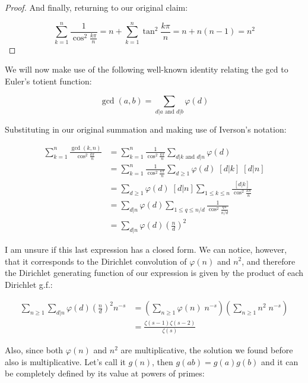 \documentclass{letter}
\begin{document}
\begin{letter}{}
\begin{proof}
  And finally, returning to our original claim:

  $$\sum_{k=1}^{n}\frac{1}{\cos^2\frac{k \pi}{n}}
    = n + \sum_{k=1}^{n}\tan^2\frac{k\pi}{n} = n + n(n-1) = n^2$$
  \end{proof}

 We will now make use of the following well-known identity relating the gcd to Euler's totient function:

 $$\gcd(a, b)=\sum_{d|a \text{ and } d|b}\varphi(d)$$

 Substituting in our original summation and making use of Iverson's notation:

 \begin{align*}
   \sum_{k=1}^{n}\frac{\gcd(k, n)}{\cos^2\frac{k \pi}{n}}
     &= 
       \sum_{k=1}^{n}\frac{1}{\cos^2\frac{k \pi}{n}}
       \sum_{d|k \text{ and } d|n}\varphi(d) \\
     &= 
       \sum_{k=1}^{n}\frac{1}{\cos^2\frac{k \pi}{n}}
       \sum_{d\ge 1}\varphi(d)\;[d|k]\;[d|n] \\
     &= 
       \sum_{d\ge 1}\varphi(d)\;[d|n]
       \sum_{1\le k\le n}\frac{[d|k]}{\cos^2\frac{k \pi}{n}} \\
     &= 
       \sum_{d|n}\varphi(d)
       \sum_{1\le q\le n/d}\frac{1}{\cos^2\frac{q \pi}{n/d}}\\
     &= 
       \sum_{d|n}\varphi(d)\left(\frac{n}{d}\right)^2
 \end{align*}

  I am unsure if this last expression has a closed form. We can notice, however, that it corresponds to the Dirichlet convolution of $\varphi(n)$ and $n^2$, and therefore the Dirichlet generating function of our expression is given by the product of each Dirichlet g.f.:

  \begin{align*}
      \sum_{n\ge 1} \sum_{d|n}\varphi(d)\left(\frac{n}{d}\right)^2 n^{-s}
      &=
      \left(\sum_{n\ge 1}\varphi(n)\;n^{-s}\right)
      \left(\sum_{n\ge 1}n^2\; n^{-s}\right)\\
      &=\frac{\zeta(s-1)\zeta(s-2)}{\zeta(s)}
  \end{align*}

  Also, since both $\varphi(n)$ and $n^2$ are multiplicative, the solution we found before also is multiplicative. Let's call it $g(n)$, then $g(ab)=g(a)g(b)$ and it can be completely defined by its value at powers of primes:


\end{letter}
\end{document}
